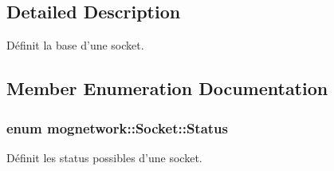 \subsection{Detailed Description}
Définit la base d'une socket. 

\subsection{Member Enumeration Documentation}
\hypertarget{classmognetwork_1_1_socket_aa187a8394ac0d6203af0ec7f021ca15f}{
\subsubsection[{Status}]{\setlength{\rightskip}{0pt plus 5cm}enum {\bf mognetwork\-::\-Socket\-::\-Status}}}\label{classmognetwork_1_1_socket_aa187a8394ac0d6203af0ec7f021ca15f}


Définit les status possibles d'une socket. 

